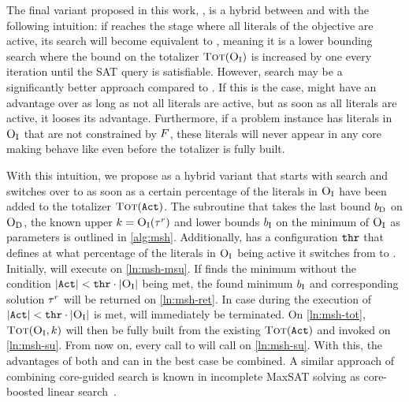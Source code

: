 The final variant proposed in this work, \msh{}, is a hybrid between \msu{} and \satunsat{} with the following intuition:
if \msu{}  reaches the stage where all literals of the objective are active, its search will become equivalent to \unsatsat{}, meaning it is a lower bounding search where the bound on the totalizer $\textsc{Tot}(\textsc{O}_{\text{I}})$ is increased by one every iteration until the SAT query is satisfiable.
However, \satunsat{} search may be a significantly better approach compared to \unsatsat{}.
If this is the case, \msu{} might have an advantage over \satunsat{} as long as not all literals are active, but as soon as all literals are active, it looses its advantage.
Furthermore, if a problem instance has literals in $\textsc{O}_{\text{I}}$ that are not constrained by $F$, these literals will never appear in any core making \msu{} behave like \unsatsat{} even before the totalizer is fully built.

With this intuition, we propose \msh{} as a hybrid variant that starts with \msu{} search and switches over to \satunsat{} as soon as a certain percentage of the literals in $\textsc{O}_{\text{I}}$ have been added to the totalizer $\textsc{Tot}(\texttt{Act})$.
The subroutine that takes the last bound $b_{\text{D}}$ on $\textsc{O}_{\text{D}}$, the known upper $k=\textsc{O}_{\text{I}}(\tau^r)$ and lower bounds $b_{\text{I}}$ on the minimum of $\textsc{O}_{\text{I}}$ as parameters is outlined in \cref{alg:msh}.
Additionally, \msh{} has a configuration $\texttt{thr}$ that defines at what percentage of the literals in $\textsc{O}_{\text{I}}$ being active it switches from \msu{} to \satunsat{}.
Initially, \msh{} will execute \msu{} on \cref{ln:msh-msu}.
If \msu{} finds the minimum without the condition $|\texttt{Act}| < \texttt{thr} \cdot |\textsc{O}_{\text{I}}|$ being met, the found minimum $b_{\text{I}}$ and corresponding solution $\tau^r$ will be returned on \cref{ln:msh-ret}.
In case during the execution of \msu{} $|\texttt{Act}| < \texttt{thr} \cdot |\textsc{O}_{\text{I}}|$ is met, \msu{} will immediately be terminated.
On \cref{ln:msh-tot}, $\textsc{Tot}(\textsc{O}_{\text{I}},k)$ will then be fully built from the existing $\textsc{Tot}(\texttt{Act})$ and \satunsat{} invoked on \cref{ln:msh-su}.
From now on, every call to \msh{} will call \satunsat{} on \cref{ln:msh-su}.
With this, the advantages of both \msu{} and \satunsat{} can in the best case be combined.
A similar approach of combining core-guided search is known in incomplete MaxSAT solving as core-boosted linear search~\autocite{DBLP:conf/cpaior/BergDS19}.

